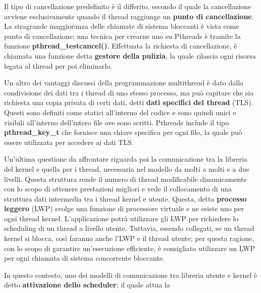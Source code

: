 \noindent Il tipo di cancellazione predefinito è il differito, secondo il quale la cancellazione avviene esclusivamente quando il thread raggiunge un
\textbf{punto di cancellazione}. La stragrande maggioranza delle chiamate di sistema bloccanti è vista come punto di cancellazione; una tecnica per
crearne uno su Pthreads è tramite la funzione \textbf{pthread\_testcancel()}. Effettuata la richiesta di cancellazione, è chiamata una funzione detta
\textbf{gestore della pulizia}, la quale rilascia ogni risorsa legata al thread per poi eliminarlo.\newline

\noindent Un altro dei vantaggi discussi della programmazione multithread è dato dalla condivisione dei dati tra i thread di uno stesso processo, ma
può capitare che sia richiesta una copia privata di certi dati, detti \textbf{dati specifici del thread} (TLS). Questi sono definiti come statici
all'interno del codice e sono quindi unici e visibili all'interno dell'intero file ove sono scritti. Pthreads include il tipo \textbf{pthread\_key\_t}
che fornisce una chiave specifica per ogni filo, la quale può essere utilizzata per accedere ai dati TLS.\par
Un'ultima questione da affrontare riguarda poi la comunicazione tra la libreria del kernel e quella per i thread, necessaria nel modello da molti a
molti e a due livelli. Questa struttura rende il numero di thread modificabile dinamicamente con lo scopo di ottenere prestazioni migliori e vede il
collocamento di una struttura dati intermedia tra i thread kernel e utente. Questa, detta \textbf{processo leggero} (LWP) svolge una funzione di
processore virtuale e ne esiste uno per ogni thread kernel. L'applicazione potrà utilizzare gli LWP per richiedere lo scheduling di un thread a livello
utente. Tuttavia, essendo collegati, se un thread kernel si blocca, così faranno anche l'LWP e il thread utente; per questa ragione, con lo scopo di
garantire un'esecuzione efficiente, è consigliato utilizzare un LWP per ogni chiamata di sistema concorrente bloccante.\par
In questo contesto, uno dei modelli di comunicazione tra libreria utente e kernel è detto \textbf{attivazione dello scheduler}; il quale attua la
